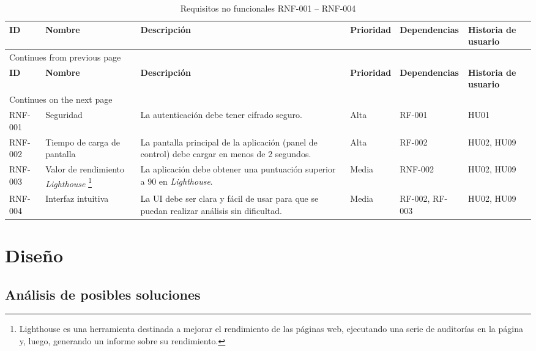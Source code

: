 \renewcommand{\arraystretch}{1.3} %
\begin{longtable}{ p{1.5cm}  p{2.2cm}  p{3cm}  p{1.3cm}  p{2.2cm}  p{2cm} }
    \caption{Requisitos no funcionales RNF-001 – RNF-004} \label{tab:requisitos-no-funcionales} \\
    \toprule
    \textbf{ID} & \textbf{Nombre} & \textbf{Descripción} & \textbf{Prioridad} & \textbf{Dependencias} & \textbf{Historia de usuario} \\
    \toprule
    \endfirsthead

    \multicolumn{3}{l}{\footnotesize Continues from previous page} \\
    \toprule
    \textbf{ID} & \textbf{Nombre} & \textbf{Descripción} & \textbf{Prioridad} & \textbf{Dependencias} & \textbf{Historia de usuario} \\
    \midrule
    \endhead

    \multicolumn{3}{l}{\footnotesize Continues on the next page} \\
    \endfoot

    \bottomrule
    \endlastfoot

    RNF-001 & Seguridad & La autenticación debe tener cifrado seguro. & Alta & RF-001 & HU01 \\
\midrule
    RNF-002 & Tiempo de carga de pantalla & La pantalla principal de la aplicación (panel de control) debe cargar en menos de 2 segundos. & Alta & RF-002 & HU02, HU09 \\
\midrule
    RNF-003 & Valor de rendimiento \textit{Lighthouse} \footnote{Lighthouse es una herramienta destinada a mejorar el rendimiento de las páginas web, ejecutando una serie de auditorías en la página y, luego, generando un informe sobre su rendimiento.} & La aplicación debe obtener una puntuación superior a 90 en \textit{Lighthouse}. & Media & RNF-002 & HU02, HU09 \\
\midrule
    RNF-004 & Interfaz intuitiva & La UI debe ser clara y fácil de usar para que se puedan realizar análisis sin dificultad. & Media & RF-002, RF-003 & HU02, HU09 \\

\end{longtable}

\section{Diseño}
\label{section:diseño}

\subsection{Análisis de posibles soluciones}

